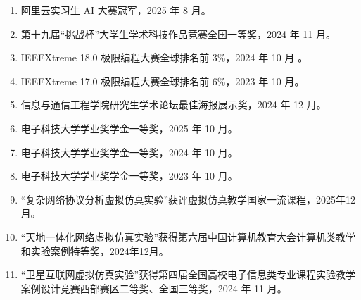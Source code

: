\begin{enumerate}
	\item 阿里云实习生 AI 大赛冠军，2025 年 8 月。
	\item 第十九届“挑战杯”大学生学术科技作品竞赛全国一等奖，2024 年 11 月。
	\item IEEEXtreme 18.0 极限编程大赛全球排名前 3\%，2024 年 10 月 。
	\item IEEEXtreme 17.0 极限编程大赛全球排名前 6\%，2023 年 10 月。
	\item 信息与通信工程学院研究生学术论坛最佳海报展示奖，2024 年 12 月。
	\item 电子科技大学学业奖学金一等奖，2025 年 10 月。
	\item 电子科技大学学业奖学金一等奖，2024 年 10 月。
	\item 电子科技大学学业奖学金一等奖，2023 年 10 月。
	\item “复杂网络协议分析虚拟仿真实验”获评虚拟仿真教学国家一流课程，2025年12月。
	\item “天地一体化网络虚拟仿真实验”获得第六届中国计算机教育大会计算机类教学和实验案例特等奖，2024年12月。
	\item “卫星互联网虚拟仿真实验”获得第四届全国高校电子信息类专业课程实验教学案例设计竞赛西部赛区二等奖、全国三等奖，2024 年 11 月。

\end{enumerate}
